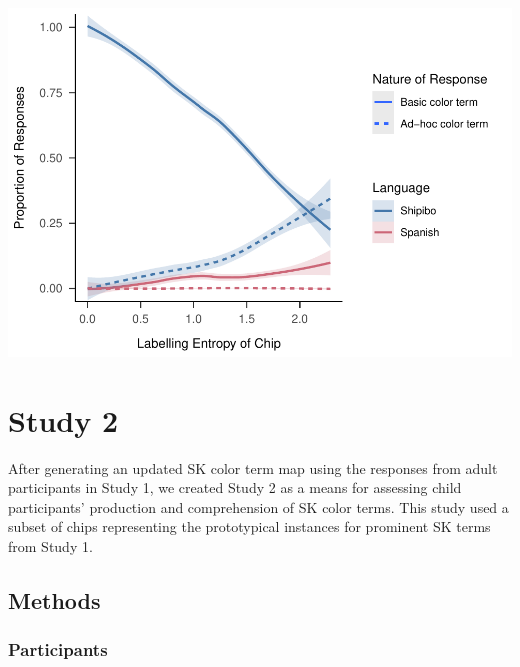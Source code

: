 \documentclass[
  english,
  ,man,floatsintext]{apa6}
\begin{document}
\includegraphics{amazon_color_files/figure-latex/study1-corrected_entropy-1.pdf}

\hypertarget{study-2}{%
\section{Study 2}\label{study-2}}

After generating an updated SK color term map using the responses from adult participants in Study 1, we created Study 2 as a means for assessing child participants' production and comprehension of SK color terms. This study used a subset of chips representing the prototypical instances for prominent SK terms from Study 1.

\hypertarget{methods-1}{%
\subsection{Methods}\label{methods-1}}

\hypertarget{participants-1}{%
\subsubsection{Participants}\label{participants-1}}
\end{document}
